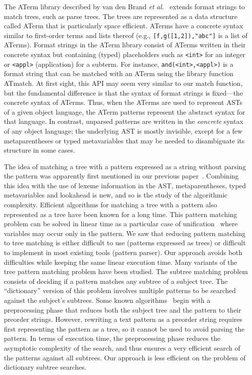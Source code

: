 The ATerm library described by van den Brand \emph{et
  al.}~\cite{aterms} extends format strings to match trees, such as
parse trees. The trees are represented as a data structure called
ATerm that is particularly space efficient. ATerms have a concrete
syntax similar to first\hyp{}order terms and lists thereof (e.g.,
\texttt{[f,g([1,2]),"abc"]} is a list of ATerms). Format strings in
the ATerm library consist of ATerms written in their concrete syntax
but containing (typed) placeholders such as \texttt{<int>} for an
integer or \texttt{<appl>} (application) for a sub\-term. For
instance, \texttt{and(<int>,<appl>)} is a format string that can be
matched with an ATerm using the library function ATmatch. At first
sight, this API may seem very similar to our match function, but the
fundamental difference is that the syntax of format strings is
fixed---the concrete syntax of ATerms. Thus, when the ATerms are used
to represent ASTs of a given object language, the ATerm patterns
represent the abstract syntax for that language. In contrast, unparsed
patterns are written in the \emph{concrete} syntax of any object
language; the underlying AST is mostly invisible, except for a few
meta\-parentheses or typed meta\-variables that may be needed to
disambiguate its structure in some cases.

The idea of matching a tree with a pattern expressed as a string
without parsing the pattern was apparently first mentioned in our
previous paper~\cite{ppdp}. Combining this idea with the use of lexeme
information in the AST, meta\-parentheses, typed meta\-variables and
lookahead is new, and so is the study of the algorithmic
complexity. Efficient algorithms for matching a tree with a pattern
also represented as a tree have been known for a long time. This
pattern matching problem can be solved in linear time as a particular
case of unification~\cite{unification} where variables may occur only
in the pattern. We saw that reducing pattern matching to tree matching
is either difficult to use (patterns expressed as trees) or difficult
to implement in most existing tools (pattern parser). Our approach
avoids both difficulties while keeping the same linear execution
time. Many variants of the tree pattern matching problem have been
studied. The subtree matching problem consists of deciding if a
pattern matches any subtree of a subject tree. The ``dictionary''
version of this problem involves multiple patterns to be searched
against the subject's subtrees. Some known algorithms~\cite{rooted}
begin with a pre\-processing phase that reduces both the subject tree
and the pattern to their pre\-order strings. However, re\-writing a
text pattern as a pre\-order string requires first representing the
pattern as a tree, so it cannot be used to avoid parsing the
pattern. In terms of execution time, the preprocessing phase reduces
the asymptotic complexity of the search, and thus ensures a very
efficient search of the patterns against all subtrees. Our approach is
less efficient on the problem of dictionary subtree searches.

